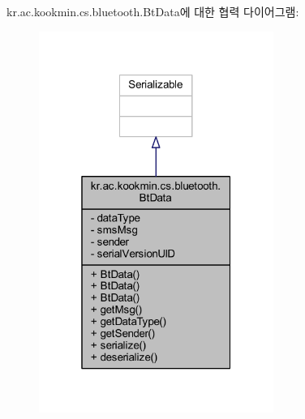 kr.\+ac.\+kookmin.\+cs.\+bluetooth.\+Bt\+Data에 대한 협력 다이어그램\+:\nopagebreak
\begin{figure}[H]
\begin{center}
\leavevmode
\includegraphics[width=217pt]{classkr_1_1ac_1_1kookmin_1_1cs_1_1bluetooth_1_1_bt_data__coll__graph}
\end{center}
\end{figure}
